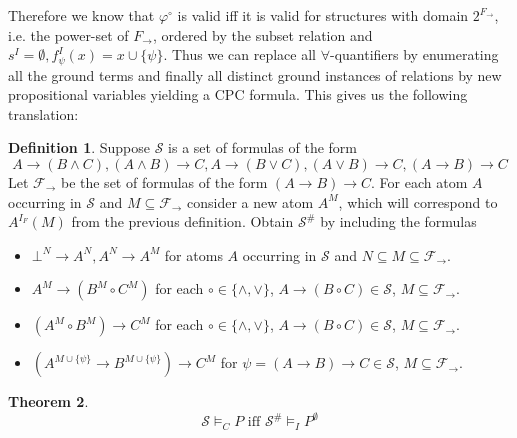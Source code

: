 \documentclass[a4paper,12pt]{report}
\theoremstyle{definition}
\newtheorem{theorem}{Theorem}[section]
\theoremstyle{definition}
\theoremstyle{definition}
\theoremstyle{definition}
\theoremstyle{definition}
\newtheorem{definition}[theorem]{Definition}
\theoremstyle{definition}
\theoremstyle{definition}
\begin{document}
	
	Therefore we know that $\varphi^\circ$ is valid iff it is valid for structures with domain $2^{F_\to}$, i.e. the power-set of $F_\to$, ordered by the subset relation and $s^I = \emptyset, f_\psi^I(x) = x\cup\{\psi\}$. Thus we can replace all $\forall$-quantifiers by enumerating all the ground terms and finally all distinct ground instances of relations by new propositional variables yielding a CPC formula. This gives us the following translation:
	
	\begin{definition}
		Suppose $\mathcal S$ is a set of formulas of the form
		$$A\to (B\wedge C), (A\wedge B)\to C, A\to (B\vee C),(A\vee B)\to C, (A\to B)\to C$$
		Let $\mathcal F_\to$ be the set of formulas of the form $(A\to B)\to C$. For each atom $A$ occurring in $\mathcal S$ and $M\subseteq \mathcal F_\to$ consider a new atom $A^{M}$, which will correspond to $A^{I_F}(M)$ from the previous definition. Obtain $\mathcal S^\#$ by including the formulas
		\begin{itemize}
			\item $\bot^N\to A^N, A^N\to A^M$ for atoms $A$ occurring in $\mathcal S$ and $N\subseteq M\subseteq \mathcal F_\to$.
			\item $A^M\to (B^M\circ C^M)$ for each $\circ\in\{\wedge,\vee\}$, $A\to (B\circ C)\in\mathcal S$, $M\subseteq \mathcal F_\to$.
			\item $(A^M\circ B^M)\to C^M$ for each $\circ\in\{\wedge,\vee\}$, $A\to (B\circ C)\in\mathcal S$, $M\subseteq \mathcal F_\to$.
			\item $(A^{M\cup \{\psi\}}\to B^{M\cup \{\psi\}})\to C^M$ for $\psi = (A\to B)\to C\in\mathcal S$, $M\subseteq \mathcal F_\to$.
		\end{itemize}
	\end{definition}

	\begin{theorem}
		$$\mathcal S\models_C P\text{ iff }\mathcal S^\#\models_I P^\emptyset$$
	\end{theorem}
\end{document}
